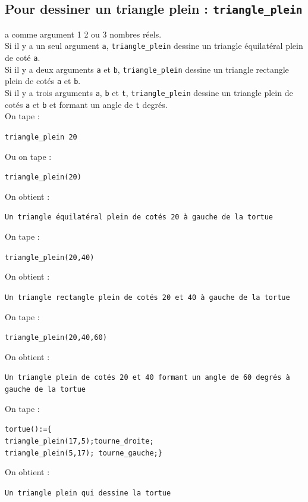 \documentclass[a4paper,11pt]{book}
\begin{document}
\subsection{Pour dessiner un triangle plein : {\tt triangle\_plein}}
 a comme argument 1  2 ou 3 nombres r\'eels.\\
 Si il y a un seul argument {\tt a}, {\tt triangle\_plein} dessine un triangle 
\'equilat\'eral plein de cot\'e {\tt a}.\\
 Si il y a deux arguments {\tt a} et {\tt b}, {\tt triangle\_plein} dessine 
un triangle rectangle plein de cot\'es {\tt a} et {\tt b}.\\
 Si il y a trois arguments {\tt a}, {\tt b} et {\tt t}, {\tt triangle\_plein} 
dessine un triangle plein de cot\'es {\tt a} et {\tt b} et formant un angle 
de {\tt t} degr\'es.\\
On tape :
\begin{center}{\tt triangle\_plein 20}\end{center}
Ou on tape :
\begin{center}{\tt triangle\_plein(20)}\end{center}
On obtient :
\begin{center}{\tt Un triangle \'equilat\'eral plein de cot\'es 20 \`a gauche de la tortue}\end{center}
On tape :
\begin{center}{\tt triangle\_plein(20,40)}\end{center}
On obtient :
\begin{center}{\tt Un triangle rectangle plein de cot\'es 20 et 40 \`a gauche de la tortue}\end{center}
On tape :
\begin{center}{\tt triangle\_plein(20,40,60)}\end{center}
On obtient :
\begin{center}{\tt Un triangle plein de cot\'es 20 et 40  formant un angle de 60 degr\'es \`a gauche de la tortue}\end{center}
On tape :
\begin{center}{\tt tortue():=\{\\
triangle\_plein(17,5);tourne\_droite;\\
triangle\_plein(5,17);
tourne\_gauche;\}}
\end{center}
On obtient :
\begin{center}{\tt Un triangle plein qui dessine la tortue}\end{center}
\end{document}
